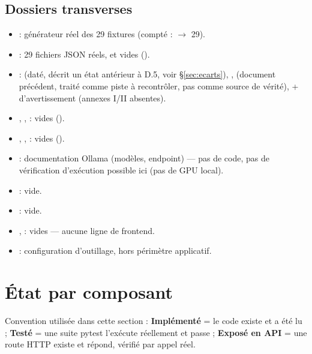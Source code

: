 \documentclass[11pt,a4paper]{article}
\begin{document}
\subsection*{Dossiers transverses}
\begin{itemize}[leftmargin=1.3em]
\item {} : g\'en\'erateur r\'eel des 29 fixtures (compt\'e :  $\to$ 29).
\item {} : 29 fichiers JSON r\'eels,  et  vides ().
\item {} :  (dat\'e, d\'ecrit un \'etat ant\'erieur \`a D.5, voir \S\ref{sec:ecarts}), ,  (document pr\'ec\'edent, trait\'e comme piste \`a recontr\^oler, pas comme source de v\'erit\'e),  +  d'avertissement (annexes I/II absentes).
\item {}, ,  : vides ().
\item {}, ,  : vides ().
\item {} : documentation Ollama (mod\`eles, endpoint) --- pas de code, pas de v\'erification d'ex\'ecution possible ici (pas de GPU local).
\item {} : vide.
\item {} : vide.
\item {},  : vides --- aucune ligne de frontend.
\item {} : configuration d'outillage, hors p\'erim\`etre applicatif.
\end{itemize}

\section{\'Etat par composant}

Convention utilis\'ee dans cette section : \textbf{Impl\'ement\'e} = le code existe et a \'et\'e lu ; \textbf{Test\'e} = une suite pytest l'ex\'ecute r\'eellement et passe ; \textbf{Expos\'e en API} = une route HTTP existe et r\'epond, v\'erifi\'e par appel r\'eel.
\end{document}
